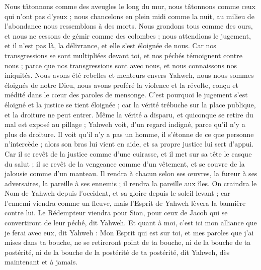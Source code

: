 \begin{multicols}{2}
Nous tâtonnons comme des aveugles le long du mur, nous tâtonnons comme ceux qui n'ont pas d'yeux ; nous chancelons en plein midi comme la nuit, au milieu de l'abondance nous ressemblons à des morts.
Nous grondons tous comme des ours, et nous ne cessons de gémir comme des colombes ; nous attendions le jugement, et il n'est pas là, la délivrance, et elle s'est éloignée de nous.
Car nos transgressions se sont multipliées devant toi, et nos péchés témoignent contre nous ; parce que nos transgressions sont avec nous, et nous connaissons nos iniquités.
Nous avons été rebelles et menteurs envers Yahweh, nous nous sommes éloignés de notre Dieu, nous avons proféré la violence et la révolte, conçu et médité dans le cœur des paroles de mensonge.
C'est pourquoi le jugement s'est éloigné et la justice se tient éloignée ; car la vérité trébuche sur la place publique, et la droiture ne peut entrer.
Même la vérité a disparu, et quiconque se retire du mal est exposé au pillage ; Yahweh voit, d'un regard indigné, parce qu'il n'y a plus de droiture.
Il voit qu'il n'y a pas un homme, il s'étonne de ce que personne n'intercède ; alors son bras lui vient en aide, et sa propre justice lui sert d'appui.
Car il se revêt de la justice comme d'une cuirasse, et il met sur sa tête le casque du salut ; il se revêt de la vengeance comme d'un vêtement, et se couvre de la jalousie comme d'un manteau.
Il rendra à chacun selon ses œuvres, la fureur à ses adversaires, la pareille à ses ennemis ; il rendra la pareille aux îles.
On craindra le Nom de Yahweh depuis l'occident, et sa gloire depuis le soleil levant ; car l'ennemi viendra comme un fleuve, mais l'Esprit de Yahweh lèvera la bannière contre lui.
Le Rédempteur viendra pour Sion, pour ceux de Jacob qui se convertiront de leur péché, dit Yahweh.
Et quant à moi, c'est ici mon alliance que je ferai avec eux, dit Yahweh : Mon Esprit qui est sur toi, et mes paroles que j'ai mises dans ta bouche, ne se retireront point de ta bouche, ni de la bouche de ta postérité, ni de la bouche de la postérité de ta postérité, dit Yahweh, dès maintenant et à jamais.

\end{multicols}
